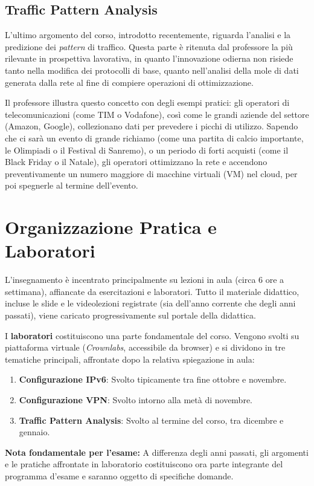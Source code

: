 \subsection{Traffic Pattern Analysis}
L'ultimo argomento del corso, introdotto recentemente, riguarda l'analisi e la predizione dei \emph{pattern} di traffico. 
Questa parte è ritenuta dal professore la più rilevante in prospettiva lavorativa, in quanto l'innovazione odierna non risiede tanto nella modifica dei protocolli di base, quanto nell'analisi della mole di dati generata dalla rete al fine di compiere operazioni di ottimizzazione.

Il professore illustra questo concetto con degli esempi pratici: gli operatori di telecomunicazioni (come TIM o Vodafone), così come le grandi aziende del settore (Amazon, Google), collezionano dati per prevedere i picchi di utilizzo. Sapendo che ci sarà un evento di grande richiamo (come una partita di calcio importante, le Olimpiadi o il Festival di Sanremo), o un periodo di forti acquisti (come il Black Friday o il Natale), gli operatori ottimizzano la rete e accendono preventivamente un numero maggiore di macchine virtuali (VM) nel cloud, per poi spegnerle al termine dell'evento. 

\section{Organizzazione Pratica e Laboratori}
L'insegnamento è incentrato principalmente su lezioni in aula (circa 6 ore a settimana), affiancate da esercitazioni e laboratori. Tutto il materiale didattico, incluse le slide e le videolezioni registrate (sia dell'anno corrente che degli anni passati), viene caricato progressivamente sul portale della didattica.

I \textbf{laboratori} costituiscono una parte fondamentale del corso. Vengono svolti su piattaforma virtuale (\emph{Crownlabs}, accessibile da browser) e si dividono in tre tematiche principali, affrontate dopo la relativa spiegazione in aula:
\begin{enumerate}
    \item \textbf{Configurazione IPv6}: Svolto tipicamente tra fine ottobre e novembre.
    \item \textbf{Configurazione VPN}: Svolto intorno alla metà di novembre.
    \item \textbf{Traffic Pattern Analysis}: Svolto al termine del corso, tra dicembre e gennaio.
\end{enumerate}
\textbf{Nota fondamentale per l'esame:} A differenza degli anni passati, gli argomenti e le pratiche affrontate in laboratorio costituiscono ora parte integrante del programma d'esame e saranno oggetto di specifiche domande.

